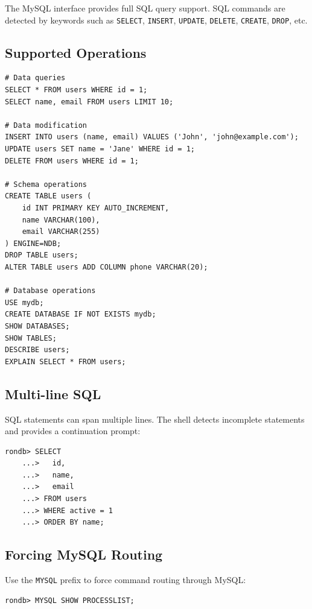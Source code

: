 \documentclass[11pt,a4paper]{report}
\begin{document}
The MySQL interface provides full SQL query support. SQL commands are detected by keywords such as \texttt{SELECT}, \texttt{INSERT}, \texttt{UPDATE}, \texttt{DELETE}, \texttt{CREATE}, \texttt{DROP}, etc.

\subsection{Supported Operations}

\begin{lstlisting}[language=rondb]
# Data queries
SELECT * FROM users WHERE id = 1;
SELECT name, email FROM users LIMIT 10;

# Data modification
INSERT INTO users (name, email) VALUES ('John', 'john@example.com');
UPDATE users SET name = 'Jane' WHERE id = 1;
DELETE FROM users WHERE id = 1;

# Schema operations
CREATE TABLE users (
    id INT PRIMARY KEY AUTO_INCREMENT,
    name VARCHAR(100),
    email VARCHAR(255)
) ENGINE=NDB;
DROP TABLE users;
ALTER TABLE users ADD COLUMN phone VARCHAR(20);

# Database operations
USE mydb;
CREATE DATABASE IF NOT EXISTS mydb;
SHOW DATABASES;
SHOW TABLES;
DESCRIBE users;
EXPLAIN SELECT * FROM users;
\end{lstlisting}

\subsection{Multi-line SQL}

SQL statements can span multiple lines. The shell detects incomplete statements and provides a continuation prompt:

\begin{lstlisting}[language=rondb]
rondb> SELECT
    ...>   id,
    ...>   name,
    ...>   email
    ...> FROM users
    ...> WHERE active = 1
    ...> ORDER BY name;
\end{lstlisting}

\subsection{Forcing MySQL Routing}

Use the \texttt{MYSQL} prefix to force command routing through MySQL:

\begin{lstlisting}[language=rondb]
rondb> MYSQL SHOW PROCESSLIST;
\end{lstlisting}
\end{document}
